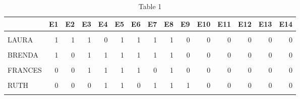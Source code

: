 \begin{table}[H]

\caption{Table 1}
\centering
\fontsize{10}{12}\selectfont
\begin{tabular}[t]{lrrrrrrrrrrrrrr}
\toprule
  & E1 & E2 & E3 & E4 & E5 & E6 & E7 & E8 & E9 & E10 & E11 & E12 & E13 & E14\\
\midrule
\cellcolor{gray!6}{EVELYN} & \cellcolor{gray!6}{1} & \cellcolor{gray!6}{1} & \cellcolor{gray!6}{1} & \cellcolor{gray!6}{1} & \cellcolor{gray!6}{1} & \cellcolor{gray!6}{1} & \cellcolor{gray!6}{0} & \cellcolor{gray!6}{1} & \cellcolor{gray!6}{1} & \cellcolor{gray!6}{0} & \cellcolor{gray!6}{0} & \cellcolor{gray!6}{0} & \cellcolor{gray!6}{0} & \cellcolor{gray!6}{0}\\
LAURA & 1 & 1 & 1 & 0 & 1 & 1 & 1 & 1 & 0 & 0 & 0 & 0 & 0 & 0\\
\cellcolor{gray!6}{THERESA} & \cellcolor{gray!6}{0} & \cellcolor{gray!6}{1} & \cellcolor{gray!6}{1} & \cellcolor{gray!6}{1} & \cellcolor{gray!6}{1} & \cellcolor{gray!6}{1} & \cellcolor{gray!6}{1} & \cellcolor{gray!6}{1} & \cellcolor{gray!6}{1} & \cellcolor{gray!6}{0} & \cellcolor{gray!6}{0} & \cellcolor{gray!6}{0} & \cellcolor{gray!6}{0} & \cellcolor{gray!6}{0}\\
BRENDA & 1 & 0 & 1 & 1 & 1 & 1 & 1 & 1 & 0 & 0 & 0 & 0 & 0 & 0\\
\cellcolor{gray!6}{CHARLOTTE} & \cellcolor{gray!6}{0} & \cellcolor{gray!6}{0} & \cellcolor{gray!6}{1} & \cellcolor{gray!6}{1} & \cellcolor{gray!6}{1} & \cellcolor{gray!6}{0} & \cellcolor{gray!6}{1} & \cellcolor{gray!6}{0} & \cellcolor{gray!6}{0} & \cellcolor{gray!6}{0} & \cellcolor{gray!6}{0} & \cellcolor{gray!6}{0} & \cellcolor{gray!6}{0} & \cellcolor{gray!6}{0}\\
\addlinespace
FRANCES & 0 & 0 & 1 & 1 & 1 & 1 & 0 & 1 & 0 & 0 & 0 & 0 & 0 & 0\\
\cellcolor{gray!6}{ELEANOR} & \cellcolor{gray!6}{0} & \cellcolor{gray!6}{0} & \cellcolor{gray!6}{0} & \cellcolor{gray!6}{1} & \cellcolor{gray!6}{1} & \cellcolor{gray!6}{1} & \cellcolor{gray!6}{1} & \cellcolor{gray!6}{1} & \cellcolor{gray!6}{0} & \cellcolor{gray!6}{0} & \cellcolor{gray!6}{0} & \cellcolor{gray!6}{0} & \cellcolor{gray!6}{0} & \cellcolor{gray!6}{0}\\
RUTH & 0 & 0 & 0 & 1 & 1 & 0 & 1 & 1 & 1 & 0 & 0 & 0 & 0 & 0\\
\cellcolor{gray!6}{VERNE} & \cellcolor{gray!6}{0} & \cellcolor{gray!6}{0} & \cellcolor{gray!6}{0} & \cellcolor{gray!6}{0} & \cellcolor{gray!6}{0} & \cellcolor{gray!6}{0} & \cellcolor{gray!6}{1} & \cellcolor{gray!6}{1} & \cellcolor{gray!6}{1} & \cellcolor{gray!6}{0} & \cellcolor{gray!6}{0} & \cellcolor{gray!6}{1} & \cellcolor{gray!6}{0} & \cellcolor{gray!6}{0}\\

\end{tabular}
\end{table}
